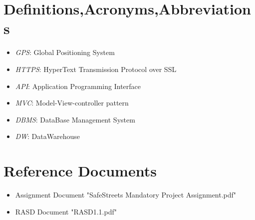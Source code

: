 \documentclass[a4paper]{report}
\begin{document}
\section{Definitions,Acronyms,Abbreviations}
\begin{itemize}
\item \textit{GPS}: Global Positioning System
\item \textit{HTTPS}: HyperText Transmission Protocol over SSL
\item \textit{API}: Application Programming Interface
\item \textit{MVC}: Model-View-controller pattern
\item \textit{DBMS}: DataBase Management System
\item \textit{DW}: DataWarehouse
\end{itemize}
\section{Reference Documents}
\begin{itemize}
\item Assignment Document "SafeStreets Mandatory Project Assignment.pdf"
\item RASD Document "RASD1.1.pdf"
\end{itemize}
\end{document}
